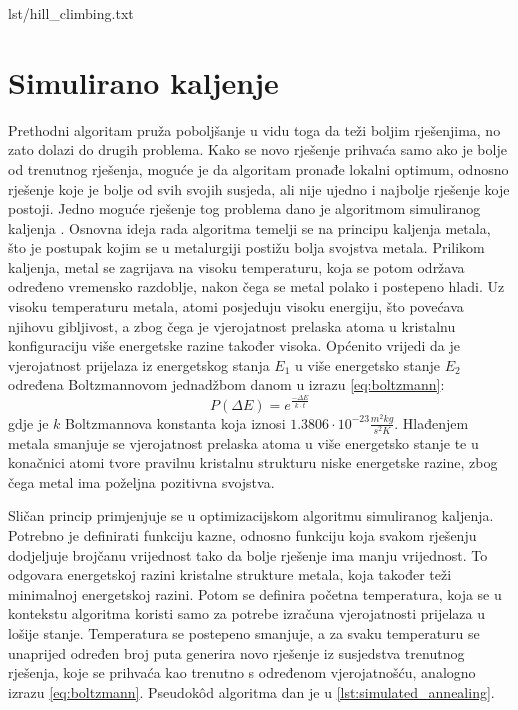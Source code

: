 \begin{minipage}{0.95\textwidth}
     {lst/hill_climbing.txt}
\end{minipage}


\section{Simulirano kaljenje}
Prethodni algoritam pruža poboljšanje u vidu toga da teži boljim rješenjima, no zato dolazi do drugih problema.
Kako se novo rješenje prihvaća samo ako je bolje od trenutnog rješenja, moguće je da algoritam pronađe lokalni optimum, odnosno rješenje koje je bolje od svih svojih susjeda, ali nije ujedno i najbolje rješenje koje postoji.
Jedno moguće rješenje tog problema dano je algoritmom simuliranog kaljenja \cite{SimulatedAnnealing}.
Osnovna ideja rada algoritma temelji se na principu kaljenja metala, što je postupak kojim se u metalurgiji postižu bolja svojstva metala.
Prilikom kaljenja, metal se zagrijava na visoku temperaturu, koja se potom održava određeno vremensko razdoblje, nakon čega se metal polako i postepeno hladi.
Uz visoku temperaturu metala, atomi posjeduju visoku energiju, što povećava njihovu gibljivost, a zbog čega je vjerojatnost prelaska atoma u kristalnu konfiguraciju više energetske razine također visoka.
Općenito vrijedi da je vjerojatnost prijelaza iz energetskog stanja $E_1$ u više energetsko stanje $E_2$ određena Boltzmannovom jednadžbom danom u izrazu \eqref{eq:boltzmann}\cite{PrirodomInspirirani}:
\begin{equation}\label{eq:boltzmann}
    P(\Delta E) = e^{\frac{-\Delta E}{k \cdot t}}
\end{equation}
gdje je $k$ Boltzmannova konstanta koja iznosi $1.3806 \cdot 10^{-23} \frac{m^2kg}{s^2 K}$.
Hlađenjem metala smanjuje se vjerojatnost prelaska atoma u više energetsko stanje te u konačnici atomi tvore pravilnu kristalnu strukturu niske energetske razine, zbog čega metal ima poželjna pozitivna svojstva.

Sličan princip primjenjuje se u optimizacijskom algoritmu simuliranog kaljenja.
Potrebno je definirati funkciju kazne, odnosno funkciju koja svakom rješenju dodjeljuje brojčanu vrijednost tako da bolje rješenje ima manju vrijednost.
To odgovara energetskoj razini kristalne strukture metala, koja također teži minimalnoj energetskoj razini.
Potom se definira početna temperatura, koja se u kontekstu algoritma koristi samo za potrebe izračuna vjerojatnosti prijelaza u lošije stanje.
Temperatura se postepeno smanjuje, a za svaku temperaturu se unaprijed određen broj puta generira novo rješenje iz susjedstva trenutnog rješenja, koje se prihvaća kao trenutno s određenom vjerojatnošću, analogno izrazu \eqref{eq:boltzmann}.
Pseudok\^{o}d algoritma dan je u \ref{lst:simulated_annealing}.

